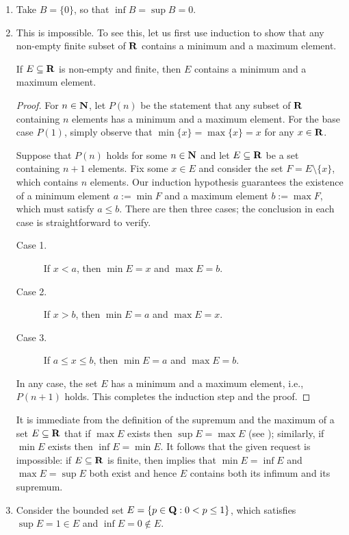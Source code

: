 \documentclass{lew98_solutions}
\begin{document}
\begin{solution}
    \begin{enumerate}
        \item Take \( B = \{ 0 \} \), so that \( \inf B = \sup B = 0 \).

        \item This is impossible. To see this, let us first use induction to show that any non-empty finite subset of \( \mathbf{R} \) contains a minimum and a maximum element.
        \begin{lemma}
        \label{lem:ex1.3.2}
            If \( E \subseteq \mathbf{R} \) is non-empty and finite, then \( E \) contains a minimum and a maximum element.
        \end{lemma}

        \begin{proof}
            For \( n \in \mathbf{N} \), let \( P(n) \) be the statement that any subset of \( \mathbf{R} \) containing \( n \) elements has a minimum and a maximum element. For the base case \( P(1) \), simply observe that \( \min \{ x \} = \max \{ x \} = x \) for any \( x \in \mathbf{R} \).

            Suppose that \( P(n) \) holds for some \( n \in \mathbf{N} \) and let \( E \subseteq \mathbf{R} \) be a set containing \( n + 1 \) elements. Fix some \( x \in E \) and consider the set \( F = E \setminus \{ x \} \), which contains \( n \) elements. Our induction hypothesis guarantees the existence of a minimum element \( a := \min F \) and a maximum element \( b := \max F \), which must satisfy \( a \leq b \). There are then three cases; the conclusion in each case is straightforward to verify.
            \begin{description}
                \item[Case 1.] If \( x < a \), then \( \min E = x \) and \( \max E = b \).

                \item[Case 2.] If \( x > b \), then \( \min E = a \) and \( \max E = x \).

                \item[Case 3.] If \( a \leq x \leq b \), then \( \min E = a \) and \( \max E = b \).
            \end{description}
            In any case, the set \( E \) has a minimum and a maximum element, i.e., \( P(n + 1) \) holds. This completes the induction step and the proof.
        \end{proof}
        It is immediate from the definition of the supremum and the maximum of a set \( E \subseteq \mathbf{R} \) that if \( \max E \) exists then \( \sup E = \max E \) (see ); similarly, if \( \min E \) exists then \( \inf E = \min E \). It follows that the given request is impossible: if \( E \subseteq \mathbf{R} \) is finite, then  implies that \( \min E = \inf E \) and \( \max E = \sup E \) both exist and hence \( E \) contains both its infimum and its supremum.

        \item Consider the bounded set \( E = \{ p \in \mathbf{Q} : 0 < p \leq 1 \} \), which satisfies \( \sup E = 1 \in E \) and \( \inf E = 0 \not\in E \).
    \end{enumerate}
\end{solution}
\end{document}
